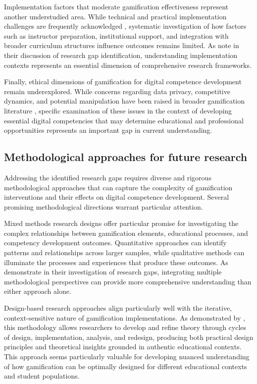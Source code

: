 \documentclass[cte]{acnsart}
\begin{document}
Implementation factors that moderate gamification effectiveness represent another understudied area. While technical and practical implementation challenges are frequently acknowledged \cite{Alhumairi202422}, systematic investigation of how factors such as instructor preparation, institutional support, and integration with broader curriculum structures influence outcomes remains limited. As \citet{Abd-Alrazaq2024} note in their discussion of research gap identification, understanding implementation contexts represents an essential dimension of comprehensive research frameworks.

Finally, ethical dimensions of gamification for digital competence development remain underexplored. While concerns regarding data privacy, competitive dynamics, and potential manipulation have been raised in broader gamification literature \cite{Hung201757}, specific examination of these issues in the context of developing essential digital competencies that may determine educational and professional opportunities represents an important gap in current understanding.

\subsection{Methodological approaches for future research}

Addressing the identified research gaps requires diverse and rigorous methodological approaches that can capture the complexity of gamification interventions and their effects on digital competence development. Several promising methodological directions warrant particular attention.

Mixed methods research designs offer particular promise for investigating the complex relationships between gamification elements, educational processes, and competency development outcomes. Quantitative approaches can identify patterns and relationships across larger samples, while qualitative methods can illuminate the processes and experiences that produce these outcomes. As \citet{Nyanchoka2020} demonstrate in their investigation of research gaps, integrating multiple methodological perspectives can provide more comprehensive understanding than either approach alone.

Design-based research approaches align particularly well with the iterative, context-sensitive nature of gamification implementations. As demonstrated by \citet{Adams2022119}, this methodology allows researchers to develop and refine theory through cycles of design, implementation, analysis, and redesign, producing both practical design principles and theoretical insights grounded in authentic educational contexts. This approach seems particularly valuable for developing nuanced understanding of how gamification can be optimally designed for different educational contexts and student populations.
\end{document}
